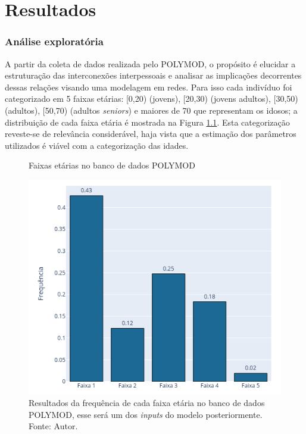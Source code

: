 \chapter{Resultados}
\label{chap:resultados}

\subsection{Análise exploratória}

A partir da coleta de dados realizada pelo POLYMOD, o propósito é elucidar a estruturação das interconexões interpessoais e analisar as implicações decorrentes dessas relações visando uma modelagem em redes. Para isso cada indivíduo foi categorizado em 5 faixas etárias: [0,20) (jovens), [20,30) (jovens adultos), [30,50) (adultos), [50,70) (adultos \textit{seniors}) e maiores de 70 que representam os idosos; a distribuição de cada faixa etária é mostrada na Figura \ref{fig:freq}. Esta categorização reveste-se de relevância considerável, haja vista que a estimação dos parâmetros utilizados é viável com a categorização das idades. 

\begin{figure}[H]
    \centering

    \captionsetup{font=normalsize,skip=0.8pt,singlelinecheck=on,labelsep=endash}
    \caption{Faixas etárias no banco de dados POLYMOD}
    \includegraphics[scale= 0.5]{figuras/faixas_polymod-PIF.png}
    \captionsetup{font=small,justification=justified}
    \caption*{Resultados da frequência de cada faixa etária no banco de dados POLYMOD, esse será um dos \textit{inputs} do modelo posteriormente.\\ Fonte: Autor.}

    \label{fig:freq}
\end{figure}

